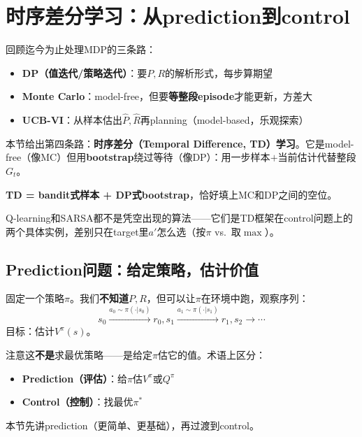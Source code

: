 \documentclass[11pt,a4paper]{article}
\theoremstyle{definition}
\begin{document}

\section{时序差分学习：从prediction到control}

\begin{plainwords}
回顾迄今为止处理MDP的三条路：
\begin{itemize}
\item \textbf{DP（值迭代/策略迭代）}：要$P, R$的解析形式，每步算期望
\item \textbf{Monte Carlo}：model-free，但要\textbf{等整段episode}才能更新，方差大
\item \textbf{UCB-VI}：从样本估出$\hat P, \hat R$再planning（model-based，乐观探索）
\end{itemize}

本节给出第四条路：\textbf{时序差分（Temporal Difference, TD）学习}。它是model-free（像MC）但用\textbf{bootstrap}绕过等待（像DP）：用一步样本$+$当前估计代替整段$G_t$。

\textbf{TD = bandit式样本 + DP式bootstrap}，恰好填上MC和DP之间的空位。

Q-learning和SARSA都不是凭空出现的算法——它们是TD框架在control问题上的两个具体实例，差别只在target里$a'$怎么选（按$\pi$ vs.\ 取$\max$）。
\end{plainwords}

\subsection{Prediction问题：给定策略，估计价值}

\begin{plainwords}[问题设定]
固定一个策略$\pi$。我们\textbf{不知道}$P, R$，但可以让$\pi$在环境中跑，观察序列：
\[
s_0 \xrightarrow{a_0\sim\pi(\cdot|s_0)} r_0, s_1 \xrightarrow{a_1\sim\pi(\cdot|s_1)} r_1, s_2 \xrightarrow{} \cdots
\]
目标：估计$V^\pi(s)$。

注意这\textbf{不是}求最优策略——是给定$\pi$估它的值。术语上区分：
\begin{itemize}
\item \textbf{Prediction（评估）}：给$\pi$估$V^\pi$或$Q^\pi$
\item \textbf{Control（控制）}：找最优$\pi^*$
\end{itemize}
本节先讲prediction（更简单、更基础），再过渡到control。
\end{plainwords}
\end{document}
